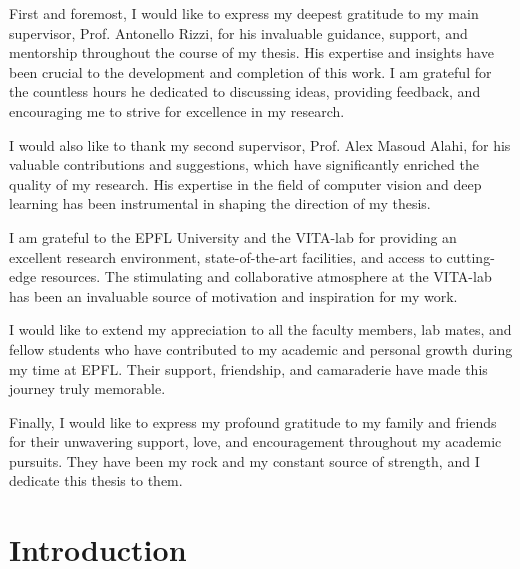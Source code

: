 \documentclass[english, LaM, oneside]{sapthesis}%
\begin{document}
First and foremost, I would like to express my deepest gratitude to my main supervisor, Prof. Antonello Rizzi, for his invaluable guidance, support, and mentorship throughout the course of my thesis. His expertise and insights have been crucial to the development and completion of this work. I am grateful for the countless hours he dedicated to discussing ideas, providing feedback, and encouraging me to strive for excellence in my research.

I would also like to thank my second supervisor, Prof. Alex Masoud Alahi, for his valuable contributions and suggestions, which have significantly enriched the quality of my research. His expertise in the field of computer vision and deep learning has been instrumental in shaping the direction of my thesis.

I am grateful to the EPFL University and the VITA-lab for providing an excellent research environment, state-of-the-art facilities, and access to cutting-edge resources. The stimulating and collaborative atmosphere at the VITA-lab has been an invaluable source of motivation and inspiration for my work.

I would like to extend my appreciation to all the faculty members, lab mates, and fellow students who have contributed to my academic and personal growth during my time at EPFL. Their support, friendship, and camaraderie have made this journey truly memorable.

Finally, I would like to express my profound gratitude to my family and friends for their unwavering support, love, and encouragement throughout my academic pursuits. They have been my rock and my constant source of strength, and I dedicate this thesis to them.


\tableofcontents

\listoffigures
\listoftables
\mainmatter
\chapter{Introduction}


\end{document}
